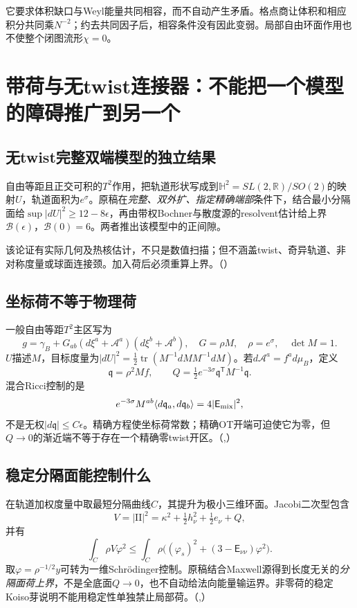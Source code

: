 \documentclass[UTF8,fontset=fandol,zihao=-4]{ctexart}
\theoremstyle{research}
\DeclareMathOperator{\tr}{tr}
\newcommand{\R}{\mathbb R}
\numberwithin{equation}{section}
\begin{document}
它要求体积缺口与Weyl能量共同相容，而不自动产生矛盾。格点商让体积和相应积分共同乘$N^{-2}$；约去共同因子后，相容条件没有因此变弱。局部自由环面作用也不使整个闭图流形$\chi=0$。

\section{带荷与无twist连接器：不能把一个模型的障碍推广到另一个}
\subsection{无twist完整双端模型的独立结果}
自由等距且正交可积的$T^2$作用，把轨道形状写成到$\mathbb H^2=SL(2,\R)/SO(2)$的映射$U$，轨道面积为$e^\sigma$。原稿在\emph{完整、双外扩、指定精确端部}条件下，结合最小分隔面给$\sup|dU|^2\ge12-8\epsilon$，再由带权Bochner与散度源的resolvent估计给上界$\mathcal B(\epsilon)$，$\mathcal B(0)=6$。两者推出该模型中的正间隙。

该论证有实际几何及热核估计，不只是数值扫描；但不涵盖twist、奇异轨道、非对称度量或球面连接颈。加入荷后必须重算上界。\cite{G}（）

\subsection{坐标荷不等于物理荷}
一般自由等距$T^2$主区写为
\[
g=\gamma_B+G_{ab}(d\xi^a+\mathcal A^a)(d\xi^b+\mathcal A^b),
\quad G=\rho M,\quad\rho=e^\sigma,\quad\det M=1.
\]
$U$描述$M$，目标度量为$|dU|^2=\tfrac12\tr(M^{-1}dM M^{-1}dM)$。若$d\mathcal A^a=f^a d\mu_B$，定义
\[
\mathfrak q=\rho^2Mf,\qquad
Q=\tfrac12e^{-3\sigma}\mathfrak q^{\mathsf T}M^{-1}\mathfrak q.
\]
混合Ricci控制的是
\[
e^{-3\sigma}M^{ab}\langle d\mathfrak q_a,d\mathfrak q_b\rangle
=4|\mathsf E_{\rm mix}|^2,
\]
不是无权$|d\mathfrak q|\le C\epsilon$。精确方程使坐标荷常数；精确OT开端可迫使它为零，但$Q\to0$的渐近端不等于存在一个精确零twist开区。\cite{G}（,）

\subsection{稳定分隔面能控制什么}
在轨道加权度量中取最短分隔曲线$C$，其提升为极小三维环面。Jacobi二次型包含
\[
V=|\mathrm{II}|^2=\kappa^2+\tfrac12h_\nu^2+\tfrac12e_\nu+Q,
\]
并有
\[
\int_C\rho V\varphi^2
\le\int_C\rho\bigl((\varphi_s)^2+(3-\mathsf E_{\nu\nu})\varphi^2\bigr).
\]
取$\varphi=\rho^{-1/2}y$可转为一维Schrödinger控制。原稿结合Maxwell源得到长度无关的\emph{分隔面荷上界}，不是全底面$Q\to0$，也不自动给法向能量输运界。非零荷的稳定Koiso芽说明不能用稳定性单独禁止局部荷。\cite{G}（,）
\end{document}
